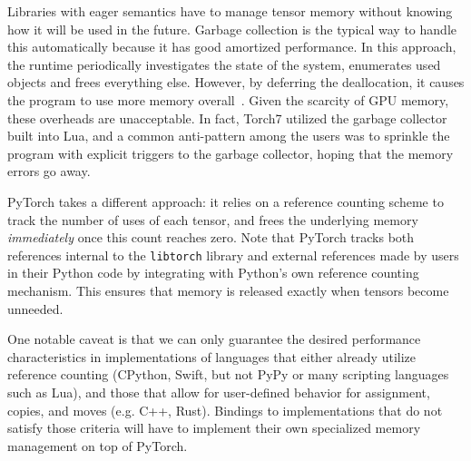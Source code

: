 Libraries with eager semantics have to manage tensor memory without knowing how it will be used in the future. Garbage collection is the typical way to handle this automatically because it has good amortized performance. In this approach, the runtime periodically investigates the state of the system, enumerates used objects and frees everything else. However, by deferring the deallocation, it causes the program to use more memory overall~\cite{garbage_collection}. Given the scarcity of GPU memory, these overheads are unacceptable. In fact, Torch7 utilized the garbage collector built into Lua, and a common anti-pattern among the users was to sprinkle the program with explicit triggers to the garbage collector, hoping that the memory errors go away.

PyTorch takes a different approach: it relies on a reference counting scheme to track the number of uses of each tensor, and frees the underlying memory \emph{immediately} once this count reaches zero. Note that PyTorch tracks both references internal to the \lstinline{libtorch} library and external references made by users in their Python code by integrating with Python's own reference counting mechanism. This ensures that memory is released exactly when tensors become unneeded.

One notable caveat is that we can only guarantee the desired performance characteristics in implementations of languages that either already utilize reference counting (CPython, Swift, but not PyPy or many scripting languages such as Lua), and those that allow for user-defined behavior for assignment, copies, and moves (e.g. C++, Rust).
Bindings to implementations that do not satisfy those criteria will have to implement their own specialized memory management on top of PyTorch.

